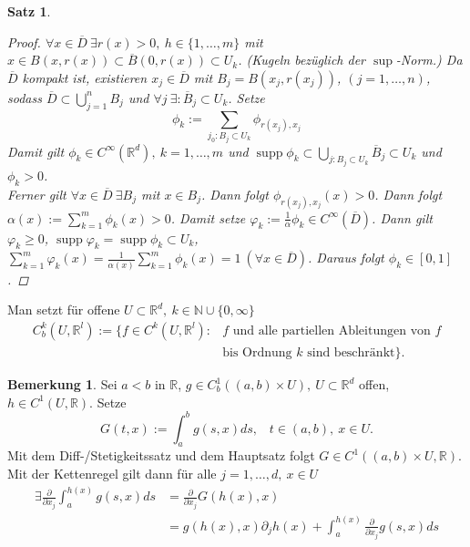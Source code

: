 \documentclass[a4paper]{report}
\newcommand{\R}{\mathbb{R}}
\newcommand{\N}{\mathbb{N}}
\newcommand{\jlabel}[1]{\label{j_#1}}
\newcommand{\supp}{\mathop{\mathrm{{supp}}}}
\theoremstyle{plain}
\newtheorem{satz}[thm]{Satz}
\theoremstyle{definition}
\newtheorem*{bem*}{Bemerkung}
\begin{document}
{{{{\begin{satz}
     \begin{proof}
         $\forall x \in \overline{D}\ \exists r(x) >0, \ h\in \{1,\dots,m\}$ mit $x\in B(x,r(x))\subset \overline{B}(0,r(x))\subset U_k$. (Kugeln bezüglich der $\sup$-Norm.) Da $\overline{D}$ kompakt ist, existieren $x_j\in \overline{D}$ mit $B_j = B(x_j, r(x_j))$, $(j=1,\dots,n)$, sodass $\overline{D} \subset \bigcup_{j=1}^n B_j$ und $\forall j\ \exists: \overline{B}_j \subset U_k$. Setze
        \[
            \phi_k := \sum_{j_0 : B_j \subset U_k} \phi_{r(x_j),x_j}
        \]
        Damit gilt $\phi_k \in C^\infty(\R^d), \ k=1,\dots,m$ und $\supp \phi_k \subset \bigcup_{j: B_j \subset U_k} \overline{B}_j\subset U_k$ und $\phi_k > 0$.\\
        Ferner gilt $\forall x\in \overline{D} \ \exists B_j$ mit $x\in B_j$. Dann folgt $\phi_{r(x_j),x_j}(x) >0$. Dann folgt $\alpha(x) := \sum_{k=1}^m \phi_k(x) >0$. Damit setze $\varphi_k := \frac{1}{\alpha} \phi_k \in C^\infty(\overline{D})$. Dann gilt $\varphi_k \ge 0$, $\supp \varphi_k = \supp \phi_k \subset U_k$, $\sum_{k=1}^m \varphi_k(x) = \frac{1}{\alpha(x)} \sum_{k=1}^m \phi_k(x) = 1\ (\forall x\in \overline{D})$. Daraus folgt $\phi_k \in [0,1]$.
     \end{proof}
\end{satz}

Man setzt für offene $U\subset \R^d, \ k\in \N \cup \{0,\infty\}$
\[
    \begin{split}
        C_b^k(U,\R^l) := \{f \in C^k(U,\R^l) : &f \text{ und alle partiellen Ableitungen von } f\\
                                               &\text{bis Ordnung $k$ sind beschränkt}\}.
    \end{split}
\]

\begin{bem*}
    Sei $a<b$ in $\R$, $g\in C_b^1((a,b)\times U), \ U\subset \R^d$ offen, $h\in C^1(U, \R)$. Setze 
    \[
        G(t,x):= \int_a^b g(s,x)ds, \hspace{10pt} t\in(a,b), \ x\in U.
    \]
    Mit dem Diff-/Stetigkeitssatz und dem Hauptsatz folgt $G\in C^1((a,b)\times U, \R)$. Mit der Kettenregel gilt dann für alle $j=1,\dots,d, \ x\in U$
    \begin{equation}
        \jlabel{(4.6)}
        \begin{split}
            \exists \frac{\partial}{\partial x_j} \int_a^{h(x)} g(s,x)ds &= \frac{\partial}{\partial x_j} G(h(x),x)\\
            &= g(h(x),x)\partial_j h(x) + \int_a^{h(x)} \frac{\partial}{\partial x_j} g(s,x) ds
        \end{split}
    \end{equation}



\end{bem*}}}}}
\end{document}
